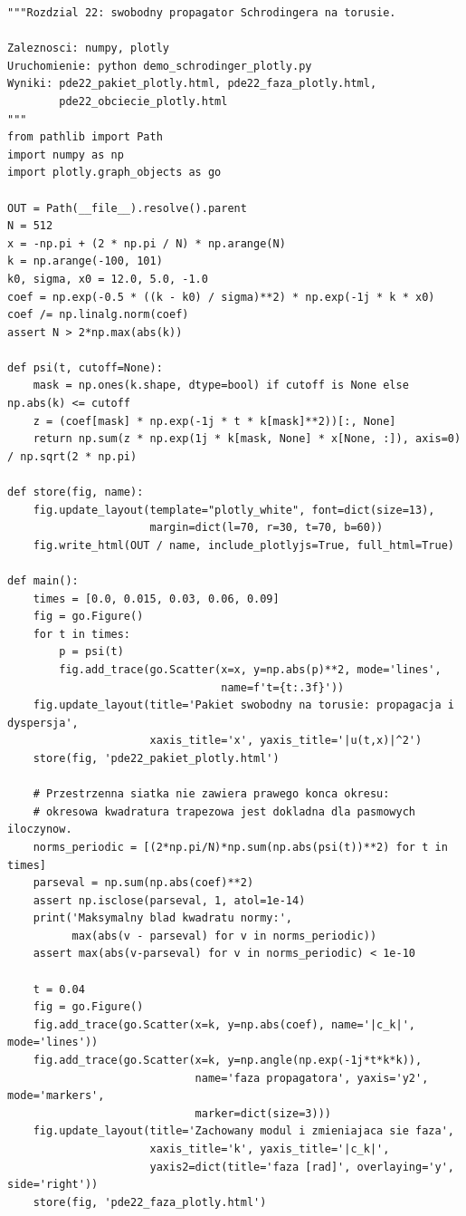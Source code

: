 \begin{lstlisting}[style=pythonpde,caption={Ewolucja Schrodingera: pakiet, faza i błąd widmowy (Plotly)},label={code:pde22-plotly}]
"""Rozdzial 22: swobodny propagator Schrodingera na torusie.

Zaleznosci: numpy, plotly
Uruchomienie: python demo_schrodinger_plotly.py
Wyniki: pde22_pakiet_plotly.html, pde22_faza_plotly.html,
        pde22_obciecie_plotly.html
"""
from pathlib import Path
import numpy as np
import plotly.graph_objects as go

OUT = Path(__file__).resolve().parent
N = 512
x = -np.pi + (2 * np.pi / N) * np.arange(N)
k = np.arange(-100, 101)
k0, sigma, x0 = 12.0, 5.0, -1.0
coef = np.exp(-0.5 * ((k - k0) / sigma)**2) * np.exp(-1j * k * x0)
coef /= np.linalg.norm(coef)
assert N > 2*np.max(abs(k))

def psi(t, cutoff=None):
    mask = np.ones(k.shape, dtype=bool) if cutoff is None else np.abs(k) <= cutoff
    z = (coef[mask] * np.exp(-1j * t * k[mask]**2))[:, None]
    return np.sum(z * np.exp(1j * k[mask, None] * x[None, :]), axis=0) / np.sqrt(2 * np.pi)

def store(fig, name):
    fig.update_layout(template="plotly_white", font=dict(size=13),
                      margin=dict(l=70, r=30, t=70, b=60))
    fig.write_html(OUT / name, include_plotlyjs=True, full_html=True)

def main():
    times = [0.0, 0.015, 0.03, 0.06, 0.09]
    fig = go.Figure()
    for t in times:
        p = psi(t)
        fig.add_trace(go.Scatter(x=x, y=np.abs(p)**2, mode='lines',
                                 name=f't={t:.3f}'))
    fig.update_layout(title='Pakiet swobodny na torusie: propagacja i dyspersja',
                      xaxis_title='x', yaxis_title='|u(t,x)|^2')
    store(fig, 'pde22_pakiet_plotly.html')

    # Przestrzenna siatka nie zawiera prawego konca okresu:
    # okresowa kwadratura trapezowa jest dokladna dla pasmowych iloczynow.
    norms_periodic = [(2*np.pi/N)*np.sum(np.abs(psi(t))**2) for t in times]
    parseval = np.sum(np.abs(coef)**2)
    assert np.isclose(parseval, 1, atol=1e-14)
    print('Maksymalny blad kwadratu normy:',
          max(abs(v - parseval) for v in norms_periodic))
    assert max(abs(v-parseval) for v in norms_periodic) < 1e-10

    t = 0.04
    fig = go.Figure()
    fig.add_trace(go.Scatter(x=k, y=np.abs(coef), name='|c_k|', mode='lines'))
    fig.add_trace(go.Scatter(x=k, y=np.angle(np.exp(-1j*t*k*k)),
                             name='faza propagatora', yaxis='y2', mode='markers',
                             marker=dict(size=3)))
    fig.update_layout(title='Zachowany modul i zmieniajaca sie faza',
                      xaxis_title='k', yaxis_title='|c_k|',
                      yaxis2=dict(title='faza [rad]', overlaying='y', side='right'))
    store(fig, 'pde22_faza_plotly.html')


\end{lstlisting}
